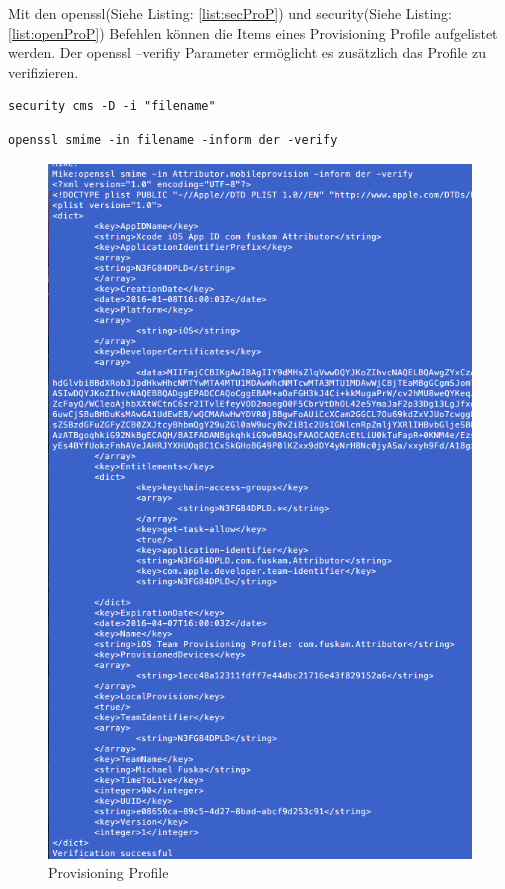 Mit den \glqq openssl\grqq{}(Siehe Listing: \ref{list:secProP}) und \glqq security\grqq{}(Siehe Listing: \ref{list:openProP}) Befehlen können die Items eines Provisioning Profile aufgelistet werden. Der \glqq openssl --verifiy\grqq{} Parameter ermöglicht es zusätzlich das Profile zu verifizieren. 
\newline

\lstset{
    language=bash,
    }
\begin{lstlisting}[captionpos=b, caption={Befehl: security}, label=list:secProP]
security cms -D -i "filename" 
\end{lstlisting}

\begin{lstlisting}[captionpos=b, caption={Befehl: openssl -- (Siehe Abbildung: \ref{fig:ProvisioningProfile})}, label=list:openProP]
openssl smime -in filename -inform der -verify
\end{lstlisting}

\begin{figure}[htp!]
        \centering
                \includegraphics[scale=0.6]{SGML-Format}
        \caption{Provisioning Profile}
        \label{fig:ProvisioningProfile}
\end{figure}

